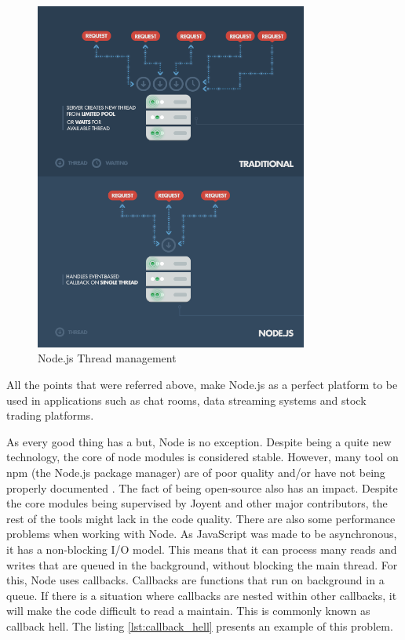 \begin{figure}[ht]
\centering
\includegraphics[width=0.8\textwidth,keepaspectratio]{chapters/State_of_the_Art/assets/node-functioning.png}
\caption[Node.js Thread management]{Node.js Thread management\footnotemark}
\label{fig:nodeThreadManagement}
\end{figure}


\par
All the points that were referred above, make Node.js as a perfect platform to be used in applications such as chat rooms, data streaming systems and stock trading platforms.
\par

As every good thing has a but, Node is no exception. Despite being a quite new technology, the core of node modules is considered stable. However, many tool on npm (the Node.js package manager) are of poor quality and/or have not being properly documented \parencite{goodAndBadOfNode}. The fact of being open-source also has an impact. Despite the core modules being supervised by Joyent and other major contributors, the rest of the tools might lack in the code quality. There are also some performance problems when working with Node. As JavaScript was made to be asynchronous, it has a non-blocking \gls{I/O} model. This means that it can process many reads and writes that are queued in the background, without blocking the main thread. For this, Node uses callbacks. Callbacks are functions that run on background in a queue. If there is a situation where callbacks are nested within other callbacks, it will make the code difficult to read a maintain. This is commonly known as callback hell. The listing \ref{lst:callback_hell} presents an example of this problem.
\par

